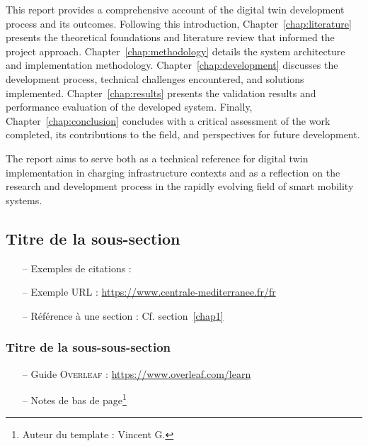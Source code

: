 This report provides a comprehensive account of the digital twin development process and its outcomes. Following this introduction, Chapter~\ref{chap:literature} presents the theoretical foundations and literature review that informed the project approach. Chapter~\ref{chap:methodology} details the system architecture and implementation methodology. Chapter~\ref{chap:development} discusses the development process, technical challenges encountered, and solutions implemented. Chapter~\ref{chap:results} presents the validation results and performance evaluation of the developed system. Finally, Chapter~\ref{chap:conclusion} concludes with a critical assessment of the work completed, its contributions to the field, and perspectives for future development.

The report aims to serve both as a technical reference for digital twin implementation in charging infrastructure contexts and as a reflection on the research and development process in the rapidly evolving field of smart mobility systems.

\subsection{Titre de la sous-section}

\begin{itemize}
    \item[--] Exemples de citations : \cite{goodfellow2016deep} \cite{higham2019deep} \cite{openai2024chatgpt}
    \item[--] Exemple URL : \url{https://www.centrale-mediterranee.fr/fr}
    \item[--] Référence à une section : Cf. section~\ref{chap1}
\end{itemize}

\subsubsection{Titre de la sous-sous-section}
\begin{itemize}
    \item[--] Guide \textsc{Overleaf} : \url{https://www.overleaf.com/learn}
    \item[--] Notes de bas de page\footnote{Auteur du template : Vincent \textsc{G.}}
\end{itemize}




